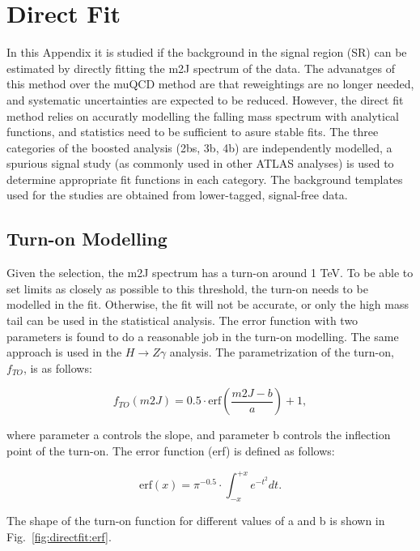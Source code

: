 \section{Direct Fit} %
\label{app:directfit}

In this Appendix it is studied if the background in the signal region (SR) can be estimated by directly fitting the m2J spectrum of the data.
The advanatges of this method over the muQCD method are that reweightings are no longer needed, and systematic uncertainties are expected to be reduced.
However, the direct fit method relies on accuratly modelling the falling mass spectrum with analytical functions, and statistics need to be sufficient to asure stable fits. The three categories of the boosted analysis (2bs, 3b, 4b) are independently modelled, a spurious signal study (as commonly used in other ATLAS analyses) is used to determine appropriate fit functions in each category. The background templates used for the studies are obtained from lower-tagged, signal-free data. 

\subsection{Turn-on Modelling}

Given the selection, the m2J spectrum has a turn-on around 1 TeV. To be able to set limits as closely as possible to this threshold, the turn-on needs to be modelled in the fit. Otherwise, the fit will not be accurate, or only the high mass tail can be used in the statistical analysis.
The error function with two parameters is found to do a reasonable job in the turn-on modelling. The same approach is used in the $H\to Z\gamma$ analysis.
The parametrization of the turn-on, $f_{TO}$, is as follows:

\begin{equation}
f_{TO}(m2J) = 0.5\cdot \mathrm{erf}\left(\frac{m2J-b}{a}\right)+1,
\end{equation}

where parameter a controls the slope, and parameter b controls the inflection point of the turn-on. The error function (erf) is defined as follows:

\begin{equation}
\mathrm{erf}(x) = \pi^{-0.5}\cdot \int_{-x}^{+x} e^{-t^2} dt.
\end{equation}

The shape of the turn-on function for different values of a and b is shown in Fig.~\ref{fig:directfit:erf}.

